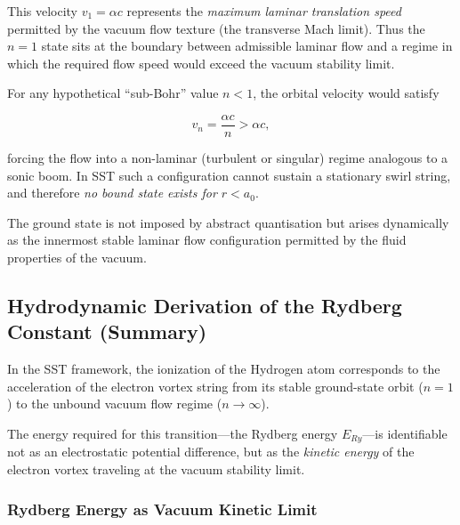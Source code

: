         This velocity $v_1 = \alpha c$ represents the \emph{maximum laminar
translation speed} permitted by the vacuum flow texture (the transverse
        Mach limit). Thus the $n=1$ state sits at the boundary between
        admissible laminar flow and a regime in which the required flow speed
        would exceed the vacuum stability limit.

        For any hypothetical ``sub-Bohr'' value $n<1$, the orbital velocity
        would satisfy

        \begin{equation}
            v_n = \frac{\alpha c}{n} > \alpha c,
        \end{equation}

        forcing the flow into a non-laminar (turbulent or singular) regime
        analogous to a sonic boom. In SST such a configuration cannot sustain
        a stationary swirl string, and therefore \emph{no bound state exists
for $r < a_0$}.

        The ground state is not imposed by abstract quantisation but arises
        dynamically as the innermost stable laminar flow configuration permitted
        by the fluid properties of the vacuum.
\subsection{Hydrodynamic Derivation of the Rydberg Constant (Summary)}
    \label{sec:SST_rydberg}

    In the SST framework, the ionization of the Hydrogen atom corresponds to
    the acceleration of the electron vortex string from its stable ground-state
    orbit ($n=1$) to the unbound vacuum flow regime ($n \to \infty$).

    The energy required for this transition—the Rydberg energy $E_{Ry}$—is
    identifiable not as an electrostatic potential difference, but as the
    \emph{kinetic energy} of the electron vortex traveling at the vacuum
    stability limit.

    \subsubsection*{Rydberg Energy as Vacuum Kinetic Limit}

